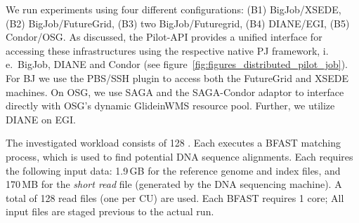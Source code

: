\documentclass[conference]{IEEEtran}
\begin{document}

We run experiments using four different
configurations: (B1) BigJob/XSEDE, (B2) BigJob/FutureGrid, (B3) two
BigJob/Futuregrid, (B4) DIANE/EGI, (B5) Condor/OSG.   As discussed, the 
Pilot-API provides a unified interface for
accessing these infrastructures using the respective native PJ framework, 
i.\,e.\ BigJob, DIANE and Condor (see
figure~\ref{fig:figures_distributed_pilot_job}).  For BJ we use the
PBS/SSH plugin to access both the FutureGrid and XSEDE machines.  On
OSG, we use SAGA and the SAGA-Condor adaptor to interface directly
with OSG's dynamic GlideinWMS resource pool. Further, we utilize
DIANE on EGI.

The investigated workload consists of 128 \cus. Each \cu executes a BFAST
matching process, which is used to find potential DNA sequence alignments.
Each \cu requires the following input data: 1.9\,GB for the
reference genome and index files, and 170\,MB for the \textit{short read}
file (generated by the DNA sequencing machine). A total
of 128 read files (one per CU) are used. Each BFAST \cu requires 1 core; All
input files are staged previous to the actual run.



\end{document}
